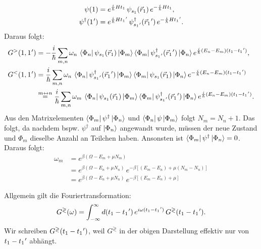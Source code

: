 \begin{align*}
  \psi(1)                     & = e^{\frac{i}{\hbar}Ht_1}\,\psi_{s_1}(\vec r_1)\,e^{-\frac{i}{\hbar}Ht_1},                                                   \\
  \psi^{\dagger}(1\mkern1mu') & = e^{\frac{i}{\hbar}Ht_1\mkern1mu'}\,\psi^{\dagger}_{s_1\mkern1mu'}(\vec r_1\mkern1mu')\,e^{-\frac{i}{\hbar}Ht_1\mkern1mu'}.
\end{align*}
Daraus folgt:
\begin{align}
  G^{>}(1,1\mkern1mu')
   & = -\frac{i}{\hbar}\sum_{m,n}\omega_n\,
  \left\langle\Phi_n\right|\psi_{s_1}(\vec r_1)\left|\Phi_m\right\rangle
  \left\langle\Phi_m\right|\psi^{\dagger}_{s_1\mkern1mu'}(\vec r_1\mkern1mu')\left|\Phi_n\right\rangle
  e^{\frac{i}{\hbar}(E_n-E_m)(t_1-t_1\mkern1mu')},                       \\
  G^{<}(1,1\mkern1mu')
   & = \frac{i}{\hbar}\sum_{m,n}\omega_n\,
  \left\langle\Phi_n\right|\psi^{\dagger}_{s_1\mkern1mu'}(\vec r_1\mkern1mu')\left|\Phi_m\right\rangle
  \left\langle\Phi_m\right|\psi_{s_1}(\vec r_1)\left|\Phi_n\right\rangle
  e^{-\frac{i}{\hbar}(E_n-E_m)(t_1-t_1\mkern1mu')}\notag                 \\
   & \overset{m\leftrightarrow n}{=} \frac{i}{\hbar}\sum_{m,n}\omega_m\,
  \left\langle\Phi_n\right|\psi_{s_1}(\vec r_1)\left|\Phi_m\right\rangle
  \left\langle\Phi_m\right|\psi^{\dagger}_{s_1\mkern1mu'}(\vec r_1\mkern1mu')\left|\Phi_n\right\rangle
  e^{\frac{i}{\hbar}(E_n-E_m)(t_1-t_1\mkern1mu')}.
\end{align}
Aus den Matrixelementen $\left\langle\Phi_m\right|\psi^{\dagger}\left|\Phi_n\right\rangle$ und $\left\langle\Phi_n\right|\psi\left|\Phi_m\right\rangle$ folgt $N_m=N_n+1$. Das folgt, da nachdem bspw. $\psi^\dagger$ auf $\left|\Phi_n\right\rangle$ angewandt wurde, müssen der neue Zustand und $\Phi_m$ dieselbe Anzahl an Teilchen haben. Ansonsten ist $\left\langle\Phi_m\right|\psi^\dagger \left|\Phi_n\right\rangle = 0$. Daraus folgt:
\begin{equation}
  \begin{aligned}
    \omega_m
     & = e^{\beta(\Omega-E_m+\mu N_m)}                                                \\
     & = e^{\beta(\Omega-E_n+\mu N_n)}\,e^{-\beta\left[(E_m-E_n)+\mu(N_m-N_n)\right]} \\
     & = e^{\beta(\Omega-E_n+\mu N_n)}\,e^{-\beta\left[(E_m-E_n)+\mu\right]}
  \end{aligned}
\end{equation}

Allgemein gilt die Fouriertransformation:
\begin{equation*}
  G^{\gtrless}(\omega)
  = \int_{-\infty}^{\infty} d(t_1-t_1\mkern1mu')\,e^{i\omega(t_1-t_1\mkern1mu')}\,G^{\gtrless}(t_1-t_1\mkern1mu').
\end{equation*}
Wir schreiben $G^{\gtrless}(t_1-t_1\mkern1mu')$, weil $G^{\gtrless}$ in der obigen Darstellung effektiv nur von $t_1-t_1\mkern1mu'$ abhängt.

